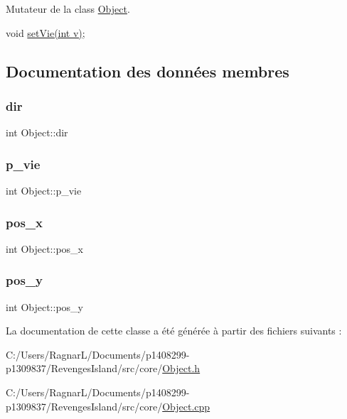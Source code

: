 Mutateur de la class \hyperlink{class_object}{Object}. 

void \hyperlink{class_object_ac0880db52bcbcd3022278d62956d666e}{set\+Vie(int v)}; 

\subsection{Documentation des données membres}
\mbox{\label{class_object_a1267bc5eb5865f7ad9de7d822483c0e0}} 
\subsubsection{\texorpdfstring{dir}{dir}}
{\footnotesize\ttfamily int Object\+::dir\hspace{0.3cm}{\ttfamily [private]}}

\mbox{\label{class_object_a1710b8b8e0d814406f84ca905d411e69}} 
\subsubsection{\texorpdfstring{p\+\_\+vie}{p\_vie}}
{\footnotesize\ttfamily int Object\+::p\+\_\+vie\hspace{0.3cm}{\ttfamily [private]}}

\mbox{\label{class_object_a2fc9911a2ee453f97ccfad331dc29e3a}} 
\subsubsection{\texorpdfstring{pos\+\_\+x}{pos\_x}}
{\footnotesize\ttfamily int Object\+::pos\+\_\+x\hspace{0.3cm}{\ttfamily [private]}}

\mbox{\label{class_object_a5acac61f66b23f32ad2ed7aa2e93c307}} 
\subsubsection{\texorpdfstring{pos\+\_\+y}{pos\_y}}
{\footnotesize\ttfamily int Object\+::pos\+\_\+y\hspace{0.3cm}{\ttfamily [private]}}



La documentation de cette classe a été générée à partir des fichiers suivants \+:\begin{DoxyCompactItemize}
\item 
C\+:/\+Users/\+Ragnar\+L/\+Documents/p1408299-\/p1309837/\+Revenges\+Island/src/core/\hyperlink{_object_8h}{Object.\+h}\item 
C\+:/\+Users/\+Ragnar\+L/\+Documents/p1408299-\/p1309837/\+Revenges\+Island/src/core/\hyperlink{_object_8cpp}{Object.\+cpp}\end{DoxyCompactItemize}
